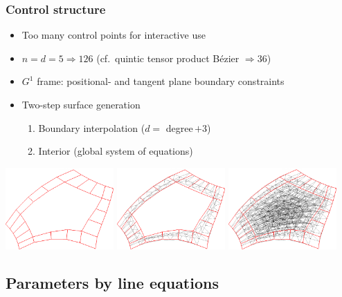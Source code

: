 \documentclass[xcolor=table]{beamer}
\begin{document}
\begin{frame}
  \frametitle{Control structure}
  \begin{itemize}
  \item Too many control points for interactive use
  \item $n=d=5\Rightarrow126$ (cf.~quintic tensor product B\'ezier $\Rightarrow36$)
  \item $G^1$ frame: positional- and tangent plane boundary constraints
  \item Two-step surface generation
    \begin{enumerate}
    \item Boundary interpolation ($d=$ degree\,$+3$)
    \item Interior (global system of equations)
    \end{enumerate}
  \end{itemize}
  \vfill
  \includegraphics[width = 0.31\textwidth]{images/5-5-bezier-ribbon.png}
  \hfill
  \includegraphics[width = 0.31\textwidth]{images/5-5-cnet-ribbon.png}
  \hfill
  \includegraphics[width = 0.31\textwidth]{images/5-5-cnet-full.png}
\end{frame}

\subsection{Parameters by line equations}
\end{document}
